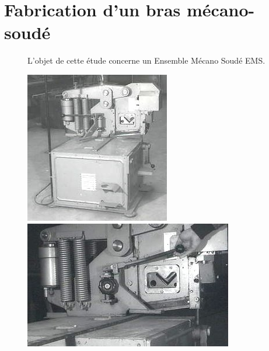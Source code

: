 

\section{Fabrication d'un bras mécano-soudé}

\begin{figure}[!h]
 \begin{minipage}{0.45\linewidth}
  L'objet de cette étude concerne un Ensemble Mécano Soudé EMS.
 \end{minipage}
 \hfill
 \begin{minipage}{0.20\linewidth}
  \centering\includegraphics[width=1\linewidth]{img/EMS1.jpg}
 \end{minipage}
  \hfill
 \begin{minipage}{0.32\linewidth}
  \centering\includegraphics[width=0.8\linewidth]{img/EMS2.jpg}
 \end{minipage}
\end{figure}

